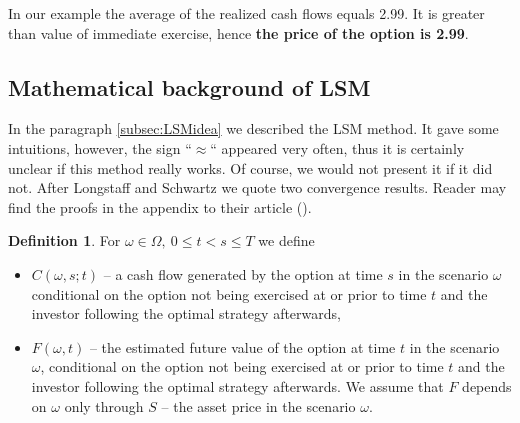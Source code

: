 \documentclass[a4paper,11pt, twoside]{book}
\theoremstyle{definition}
\newtheorem{mydef}{Definition}[chapter]
\theoremstyle{remark}
\newcounter{example}[chapter]
\begin{document}
In our example the average of the realized cash flows equals 2.99. It is greater than value of immediate exercise, hence \textbf{the price of the option is 2.99}.

\subsection{Mathematical background of LSM}
In the paragraph \ref{subsec:LSMidea} we described the LSM method. It gave some intuitions, however, the sign ``$\approx$`` appeared very often, thus it is certainly unclear if this method really works. Of course, we would not present it if it did not. After Longstaff and Schwartz we quote two convergence results. Reader may find the proofs in the appendix to their article (\cite{l-sch}).

\begin{mydef}
 For $\omega \in \Omega,\ 0 \leq t < s \leq T$ we define 
 \begin{itemize}
  \item $C(\omega, s; t)$ -- a cash flow generated by the option at time $s$ in the scenario $\omega$ conditional on the option not being exercised at or prior to time $t$ and the investor following the optimal strategy afterwards,
  \item $F(\omega, t)$ -- the estimated future value of the option at time $t$ in the scenario $\omega$, conditional on the option not being exercised at or prior to time $t$ and the investor following the optimal strategy afterwards. We assume that $F$ depends on $\omega$ only through $S$ -- the asset price in the scenario $\omega$.
 \end{itemize}
\end{mydef}
\end{document}
